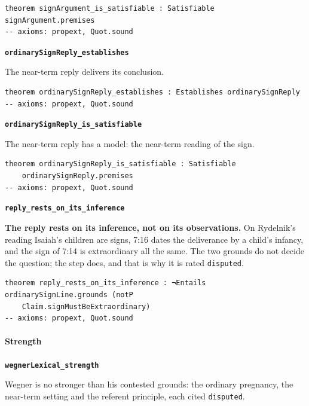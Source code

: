 \documentclass[11pt]{article}
\begin{document}
{\small\begin{verbatim}
theorem signArgument_is_satisfiable : Satisfiable signArgument.premises
-- axioms: propext, Quot.sound
\end{verbatim}}
\par\medskip\noindent\textbf{\texttt{ordinary\allowbreak{}Sign\allowbreak{}Reply\_\allowbreak{}establishes}}\par\nobreak\noindent
The near-term reply delivers its conclusion.

{\small\begin{verbatim}
theorem ordinarySignReply_establishes : Establishes ordinarySignReply
-- axioms: propext, Quot.sound
\end{verbatim}}
\par\medskip\noindent\textbf{\texttt{ordinary\allowbreak{}Sign\allowbreak{}Reply\_\allowbreak{}is\_\allowbreak{}satisfiable}}\par\nobreak\noindent
The near-term reply has a model: the near-term reading of the sign.

{\small\begin{verbatim}
theorem ordinarySignReply_is_satisfiable : Satisfiable
    ordinarySignReply.premises
-- axioms: propext, Quot.sound
\end{verbatim}}
\par\medskip\noindent\textbf{\texttt{reply\_\allowbreak{}rests\_\allowbreak{}on\_\allowbreak{}its\_\allowbreak{}inference}}\par\nobreak\noindent
\textbf{The reply rests on its inference, not on its observations.} On Rydelnik's reading Isaiah's children are signs, 7:16 dates the deliverance by a child's infancy, and the sign of 7:14 is extraordinary all the same. The two grounds do not decide the question; the step does, and that is why it is rated \texttt{disputed}.

{\small\begin{verbatim}
theorem reply_rests_on_its_inference : ¬Entails ordinarySignLine.grounds (notP
    Claim.signMustBeExtraordinary)
-- axioms: propext, Quot.sound
\end{verbatim}}
\paragraph*{Strength}
\leavevmode\par
\par\medskip\noindent\textbf{\texttt{wegner\allowbreak{}Lexical\_\allowbreak{}strength}}\par\nobreak\noindent
Wegner is no stronger than his contested grounds: the ordinary pregnancy, the near-term setting and the referent principle, each cited \texttt{disputed}.
\end{document}

